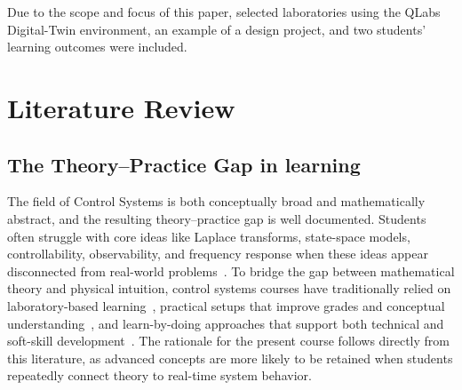 \documentclass[journal]{IEEEtran}
\begin{document}
Due to the scope and focus of this paper, selected laboratories using the QLabs Digital-Twin environment, an example of a design project, and two students' learning outcomes were included. 




\section{Literature Review}
\label{sec:literature-review}

\subsection{The Theory--Practice Gap in learning} %
\label{subsec:gap-experiential}

The field of Control Systems
is both conceptually broad and mathematically abstract, and the resulting theory--practice gap is well documented. Students often struggle with core ideas like Laplace transforms, state-space models, controllability, observability, and frequency response when these ideas appear disconnected from real-world problems~\cite{wellstead1990,kim2011lego,podrzaj2005}. To bridge the gap between mathematical theory and physical intuition, control systems 
courses have traditionally relied on laboratory-based learning~\cite{spong2005}, practical setups that improve grades and conceptual understanding~\cite{chevalier2021studentFeedbackEducationalInnovationControl}, and learn-by-doing approaches that support both technical and soft-skill development~\cite{soares2014,chaconvasquez2024digitalControlEducation}. The rationale for the present course follows directly from this literature, as advanced concepts are more likely to be retained when students repeatedly connect theory to real-time system behavior.
\end{document}
